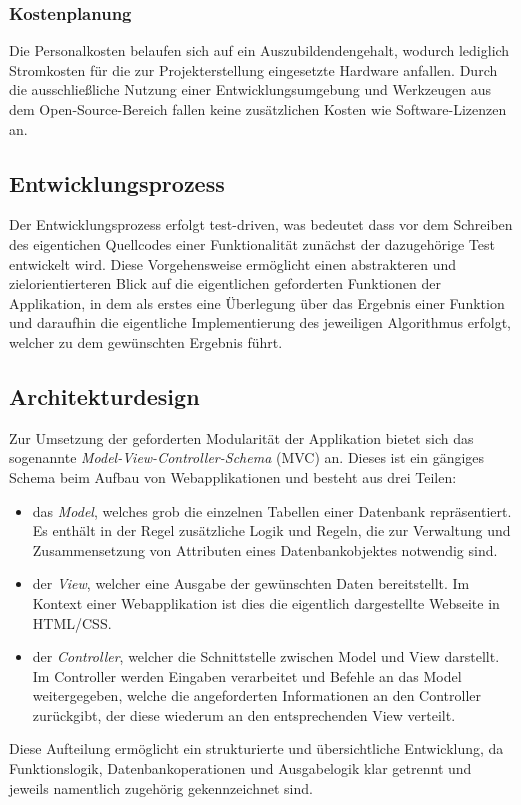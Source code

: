 \subsubsection{Kostenplanung}
\label{sec:Kostenplanung}
Die Personalkosten belaufen sich auf ein Auszubildendengehalt, wodurch lediglich Stromkosten für die
zur Projekterstellung eingesetzte Hardware anfallen. Durch die ausschließliche Nutzung einer
Entwicklungsumgebung und Werkzeugen aus dem Open-Source-Bereich fallen keine zusätzlichen Kosten wie
Software-Lizenzen an.

\subsection{Entwicklungsprozess}
\label{sec:Entwicklungsprozess}
Der Entwicklungsprozess erfolgt test-driven, was bedeutet dass vor dem Schreiben des eigentichen
Quellcodes einer Funktionalität zunächst der dazugehörige Test entwickelt wird. Diese Vorgehensweise
ermöglicht einen abstrakteren und zielorientierteren Blick auf die eigentlichen geforderten
Funktionen der Applikation, in dem als erstes eine Überlegung über das Ergebnis einer Funktion
und daraufhin die eigentliche Implementierung des jeweiligen Algorithmus erfolgt, welcher zu dem
gewünschten Ergebnis führt.

\subsection{Architekturdesign}
\label{sec:Architekturdesign}
Zur Umsetzung der geforderten Modularität der Applikation bietet sich das sogenannte
\textit{Model-View-Controller-Schema} (MVC) an. Dieses ist ein gängiges Schema beim Aufbau von Webapplikationen und
besteht aus drei Teilen:
\begin{itemize}
	\item das \textit{Model}, welches grob die einzelnen Tabellen einer Datenbank repräsentiert. Es enthält in
	der Regel zusätzliche Logik und Regeln, die zur Verwaltung und Zusammensetzung von Attributen
	eines Datenbankobjektes notwendig sind.
	\item der \textit{View}, welcher eine Ausgabe der gewünschten Daten bereitstellt. Im Kontext einer
	Webapplikation ist dies die eigentlich dargestellte Webseite in HTML/CSS.
	\item der \textit{Controller}, welcher die Schnittstelle zwischen Model und View darstellt.
	Im Controller werden Eingaben verarbeitet und Befehle an das Model weitergegeben, welche
	die angeforderten Informationen an den Controller zurückgibt, der diese wiederum an den
	entsprechenden View verteilt.
\end{itemize}
Diese Aufteilung ermöglicht ein strukturierte und übersichtliche Entwicklung, da Funktionslogik,
Datenbankoperationen und Ausgabelogik klar getrennt und jeweils namentlich zugehörig gekennzeichnet
sind.

